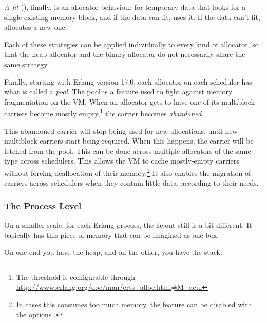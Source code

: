 \documentclass[11pt, oneside]{book}   	%
\begin{document}
\emph{A fit} (), finally, is an allocator behaviour for temporary data that looks for a single existing memory block, and if the data can fit,  uses it. If the data can't fit,  allocates a new one.

Each of these strategies can be applied individually to every kind of allocator, so that the heap allocator and the binary allocator do not necessarily share the same strategy.

Finally, starting with Erlang version 17.0, each  allocator on each scheduler has what is called a \emph{ pool}. The  pool is a feature used to fight against memory fragmentation on the VM. When an allocator gets to have one of its multiblock carriers become mostly empty,\footnote{The threshold is configurable through \href{http://www.erlang.org/doc/man/erts\_alloc.html\#M\_acul}{http://www.erlang.org/doc/man/erts\_alloc.html\#M\_acul}} the carrier becomes \emph{abandoned}. 

This abandoned carrier will stop being used for new allocations, until new multiblock carriers start being required. When this happens, the carrier will be fetched from the  pool. This can be done across multiple  allocators of the same type across schedulers. This allows the VM to cache mostly-empty carriers without forcing deallocation of their memory.\footnote{In cases this consumes too much memory, the feature can be disabled with the options .} It also enables the migration of carriers across schedulers when they contain little data, according to their needs.

\subsubsection{The Process Level}
\label{subsec:memory-process-level}

On a smaller scale, for each Erlang process, the layout still is a bit different. It basically has this piece of memory that can be imagined as one box:

\begin{VerbatimText}
[                  ]
\end{VerbatimText}

On one end you have the heap, and on the other, you have the stack:

\begin{VerbatimText}
\end{VerbatimText}
\end{document}
